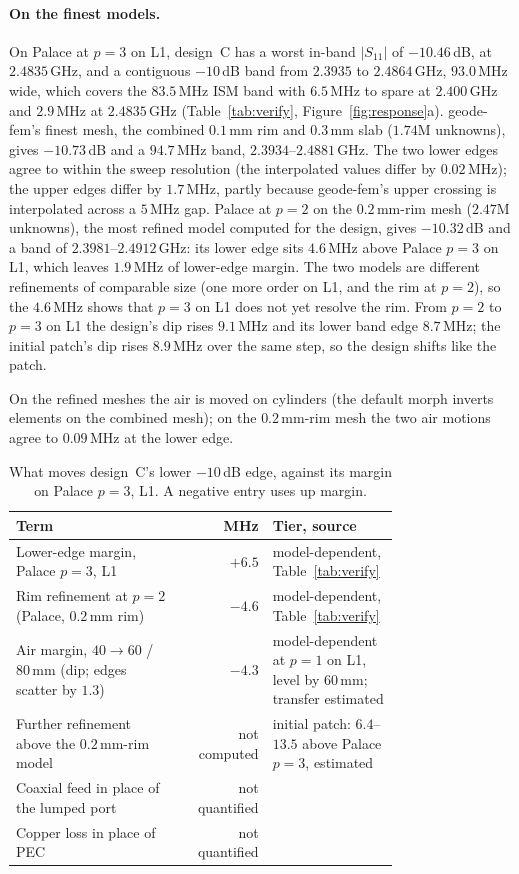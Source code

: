 \documentclass{anvil-paper}
\begin{document}
\paragraph{On the finest models.}
On Palace at $p = 3$ on L1, design~C has a worst in-band $|S_{11}|$ of
$-10.46$\,dB, at $2.4835$\,GHz, and a contiguous $-10$\,dB band from
$2.3935$ to $2.4864$\,GHz, $93.0$\,MHz wide, which covers the $83.5$\,MHz ISM
band with $6.5$\,MHz to spare at $2.400$\,GHz and $2.9$\,MHz at $2.4835$\,GHz
(Table~\ref{tab:verify}, Figure~\ref{fig:response}a). geode-fem's finest
mesh, the combined $0.1$\,mm rim and $0.3$\,mm slab ($1.74$M unknowns),
gives $-10.73$\,dB and a $94.7$\,MHz band, $2.3934$--$2.4881$\,GHz. The two
lower edges agree to within the sweep resolution (the interpolated values
differ by $0.02$\,MHz); the upper edges differ by $1.7$\,MHz, partly
because geode-fem's upper crossing is interpolated across a $5$\,MHz gap. Palace at $p = 2$ on the $0.2$\,mm-rim mesh ($2.47$M unknowns), the
most refined model computed for the design, gives $-10.32$\,dB and a band
of $2.3981$--$2.4912$\,GHz: its lower edge sits $4.6$\,MHz above Palace
$p = 3$ on L1, which leaves $1.9$\,MHz of lower-edge margin. The two models
are different refinements of comparable size (one more order on L1, and the
rim at $p = 2$), so the $4.6$\,MHz shows that $p = 3$ on L1 does not yet
resolve the rim. From $p = 2$ to $p = 3$ on L1 the design's dip rises
$9.1$\,MHz and its lower band edge $8.7$\,MHz; the initial patch's dip rises
$8.9$\,MHz over the same step, so the design shifts like the patch.

On the refined meshes the air is moved on cylinders (the default morph
inverts elements on the combined mesh); on the $0.2$\,mm-rim mesh the two
air motions agree to $0.09$\,MHz at the lower edge.

\begin{table}[t]
  \centering
  \caption{What moves design~C's lower $-10$\,dB edge, against its margin on
  Palace $p = 3$, L1. A negative entry uses up margin.}
  \label{tab:budget}
  \small
  \begin{tabular}{@{}>{\raggedright\arraybackslash}p{0.43\linewidth} r >{\raggedright\arraybackslash}p{0.33\linewidth}@{}}
    \toprule
    Term & MHz & Tier, source \\
    \midrule
    Lower-edge margin, Palace $p = 3$, L1 & $+6.5$ & model-dependent, Table~\ref{tab:verify} \\
    Rim refinement at $p = 2$ (Palace, $0.2$\,mm rim) & $-4.6$ & model-dependent, Table~\ref{tab:verify} \\
    Air margin, $40 \to 60$ / $80$\,mm (dip; edges scatter by $1.3$) & $-4.3$ & model-dependent at $p = 1$ on L1, level by $60$\,mm; transfer estimated \\
    Further refinement above the $0.2$\,mm-rim model & not computed & initial patch: $6.4$--$13.5$ above Palace $p = 3$, estimated \\
    Coaxial feed in place of the lumped port & not quantified & \\
    Copper loss in place of PEC & not quantified & \\
    \bottomrule
  \end{tabular}
\end{table}
\end{document}
